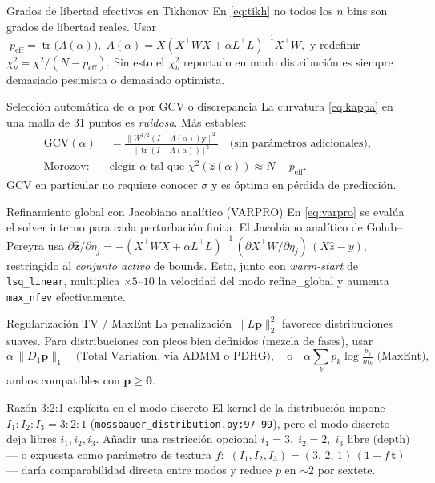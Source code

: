 \documentclass[11pt,a4paper]{article}
\newcommand{\code}[1]{\texttt{\small #1}}
\newcommand{\file}[1]{\textcolor{black!70}{\texttt{\small #1}}}
\DeclareMathOperator{\tr}{tr}
\begin{document}
\begin{mejora}{Grados de libertad efectivos en Tikhonov}\label{mej:dof}
En \eqref{eq:tikh} no todos los $n$ bins son grados de libertad reales. Usar
\(\;p_{\text{eff}} = \tr\bigl(A(\alpha)\bigr),\;A(\alpha)=X(X^\top W X+\alpha L^\top L)^{-1}X^\top W,\)
y redefinir $\chi^{2}_\nu=\chi^{2}/(N-p_{\text{eff}})$. Sin esto el $\chi^{2}_\nu$ reportado en modo distribución es siempre demasiado pesimista o demasiado optimista.
\end{mejora}

\begin{mejora}{Selección automática de $\alpha$ por GCV o discrepancia}\label{mej:alpha}
La curvatura \eqref{eq:kappa} en una malla de 31 puntos es \emph{ruidosa}. Más estables:
\begin{align*}
  \mathrm{GCV}(\alpha) &= \frac{\|W^{1/2}(I-A(\alpha))\bm y\|^{2}}{[\tr(I-A(\alpha))]^{2}}\quad\text{(sin parámetros adicionales)},\\
  \text{Morozov:}\quad &\text{elegir }\alpha\text{ tal que }\chi^{2}(\hat z(\alpha))\approx N-p_{\text{eff}}.
\end{align*}
GCV en particular no requiere conocer $\sigma$ y es óptimo en pérdida de predicción.
\end{mejora}

\begin{mejora}{Refinamiento global con Jacobiano analítico (VARPRO)}\label{mej:varpro}
En \eqref{eq:varpro} se evalúa el solver interno para cada perturbación finita. El Jacobiano analítico de Golub--Pereyra usa
\(\partial\hat{\bm z}/\partial\eta_j = -(X^\top WX+\alpha L^\top L)^{-1}\,(\partial X^\top W/\partial \eta_j)\,(X\hat z-y),\)
restringido al \emph{conjunto activo} de bounds. Esto, junto con \emph{warm-start} de \code{lsq\_linear}, multiplica $\times 5$--$10$ la velocidad del modo refine\_global y aumenta \code{max\_nfev} efectivamente.
\end{mejora}

\begin{mejora}{Regularización TV / MaxEnt}\label{mej:tv}
La penalización $\|L\bm p\|_2^{2}$ favorece distribuciones suaves. Para distribuciones con picos bien definidos (mezcla de fases), usar
\[
  \alpha\,\|D_1 \bm p\|_1 \quad\text{(Total Variation, vía ADMM o PDHG)}, \quad
  \text{o}\quad \alpha\sum_k p_k\log\!\tfrac{p_k}{m_k}\;\text{(MaxEnt)},
\]
ambos compatibles con $\bm p\ge\bm 0$.
\end{mejora}

\begin{mejora}{Razón 3:2:1 explícita en el modo discreto}\label{mej:321}
El kernel de la distribución impone $I_1{:}I_2{:}I_3=3{:}2{:}1$ (\file{mossbauer\_distribution.py:97--99}), pero el modo discreto deja libres $i_1,i_2,i_3$. Añadir una restricción opcional
\(i_1=3,\;i_2=2,\;i_3\text{ libre (depth)}\) — o expuesta como parámetro de textura $f$:
\(\,(I_1,I_2,I_3) = (3,\,2,\,1)\,(1+f\,\bm t)\) — daría comparabilidad directa entre modos y reduce $p$ en $\sim 2$ por sextete.
\end{mejora}
\end{document}
